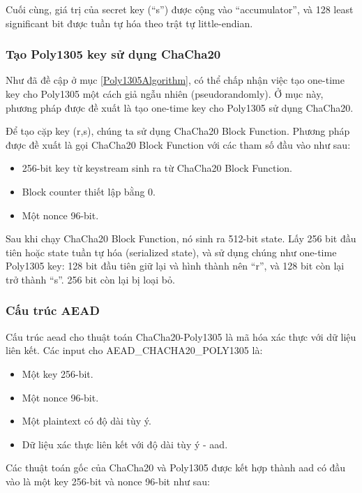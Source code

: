 Cuối cùng, giá trị của secret key (``s'') được cộng vào ``accumulator'',  và 128 least significant bit được tuần tự hóa theo trật tự little-endian.

\subsubsection{Tạo Poly1305 key sử dụng ChaCha20}
\label{CreatePoly1305UsingChaCha20}

Như đã đề cập ở mục \ref{Poly1305Algorithm}, có thể chấp nhận việc tạo one-time key cho Poly1305 một cách giả ngẫu nhiên (pseudorandomly). Ở mục này, phương pháp được đề xuất là tạo one-time key cho Poly1305 sử dụng ChaCha20.

Để tạo cặp key (r,s), chúng ta sử dụng ChaCha20 Block Function. Phương pháp được đề xuất là gọi ChaCha20 Block Function với các tham số đầu vào như sau:

\begin{itemize}
    \item 256-bit key từ keystream sinh ra từ ChaCha20 Block Function.
    \item Block counter thiết lập bằng 0.
    \item Một nonce 96-bit.
\end{itemize}

Sau khi chạy ChaCha20 Block Function, nó sinh ra 512-bit state. Lấy 256 bit đầu tiên hoặc state tuần tự hóa (serialized state), và sử dụng chúng như one-time Poly1305 key: 128 bit đầu tiên giữ lại và hình thành nên ``r'', và 128 bit còn lại trở thành ``s''. 256 bit còn lại bị loại bỏ.

\subsubsection{Cấu trúc AEAD}

Cấu trúc \acrshort{aead} cho thuật toán ChaCha20-Poly1305 là mã hóa xác thực với dữ liệu liên kết. Các input cho AEAD\_CHACHA20\_POLY1305 là:

\begin{itemize}
    \item Một key 256-bit.
    \item Một nonce 96-bit.
    \item Một plaintext có độ dài tùy ý.
    \item Dữ liệu xác thực liên kết với độ dài tùy ý - \acrfull{aad}.
\end{itemize}

Các thuật toán gốc của ChaCha20 và Poly1305 được kết hợp thành \acrshort{aad} có đầu vào là một key 256-bit và nonce 96-bit như sau:

